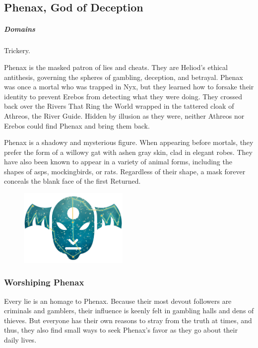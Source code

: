 \subsection*{Phenax, God of Deception} \label{ssec::phenax}
    \subparagraph{Domains} Trickery.

    Phenax is the masked patron of lies and cheats.
    They are Heliod's ethical antithesis, governing the spheres of gambling, deception, and betrayal.
    Phenax was once a mortal who was trapped in Nyx, but they learned how to forsake their identity to prevent Erebos from detecting what they were doing.
    They crossed back over the Rivers That Ring the World wrapped in the tattered cloak of Athreos, the River Guide.
    Hidden by illusion as they were, neither Athreos nor Erebos could find Phenax and bring them back.


    Phenax is a shadowy and mysterious figure.
    When appearing before mortals, they prefer the form of a willowy gat with ashen gray skin, clad in elegant robes.
    They have also been known to appear in a variety of animal forms, including the shapes of asps, mockingbirds, or rats.
    Regardless of their shape, a mask forever conceals the blank face of the first Returned.

    \begin{figure}[t]
        \centering
        \includegraphics[width=0.47\textwidth]{02viphoger/img/10s_phenax.png}
    \end{figure}

    \subsubsection{Worshiping Phenax}
        Every lie is an homage to Phenax.
        Because their most devout followers are criminals and gamblers, their influence is keenly felt in gambling halls and dens of thieves.
        But everyone has their own reasons to stray from the truth at times, and thus, they also find small ways to seek Phenax's favor as they go about their daily lives.

